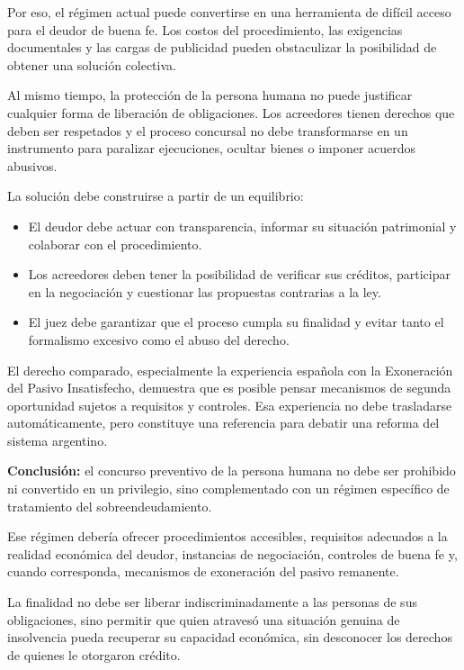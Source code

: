 \documentclass[12pt,oneside]{book}
\begin{document}
Por eso, el régimen actual puede convertirse en una herramienta de difícil acceso para el deudor de buena fe. Los costos del procedimiento, las exigencias documentales y las cargas de publicidad pueden obstaculizar la posibilidad de obtener una solución colectiva.

Al mismo tiempo, la protección de la persona humana no puede justificar cualquier forma de liberación de obligaciones. Los acreedores tienen derechos que deben ser respetados y el proceso concursal no debe transformarse en un instrumento para paralizar ejecuciones, ocultar bienes o imponer acuerdos abusivos.

La solución debe construirse a partir de un equilibrio:
\begin{itemize}
    \item El deudor debe actuar con transparencia, informar su situación patrimonial y colaborar con el procedimiento.
    \item Los acreedores deben tener la posibilidad de verificar sus créditos, participar en la negociación y cuestionar las propuestas contrarias a la ley.
    \item El juez debe garantizar que el proceso cumpla su finalidad y evitar tanto el formalismo excesivo como el abuso del derecho.
\end{itemize}

El derecho comparado, especialmente la experiencia española con la Exoneración del Pasivo Insatisfecho, demuestra que es posible pensar mecanismos de segunda oportunidad sujetos a requisitos y controles. Esa experiencia no debe trasladarse automáticamente, pero constituye una referencia para debatir una reforma del sistema argentino.

\begin{important}
\textbf{Conclusión:} el concurso preventivo de la persona humana no debe ser prohibido ni convertido en un privilegio, sino complementado con un régimen específico de tratamiento del sobreendeudamiento.
\end{important}

Ese régimen debería ofrecer procedimientos accesibles, requisitos adecuados a la realidad económica del deudor, instancias de negociación, controles de buena fe y, cuando corresponda, mecanismos de exoneración del pasivo remanente.

La finalidad no debe ser liberar indiscriminadamente a las personas de sus obligaciones, sino permitir que quien atravesó una situación genuina de insolvencia pueda recuperar su capacidad económica, sin desconocer los derechos de quienes le otorgaron crédito.
\end{document}
